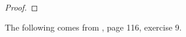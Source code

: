 \documentclass{article}
\begin{document}
\begin{proof}

\end{proof}

The following comes from \cite{MR1697859}, page 116, exercise 9.
\end{document}
